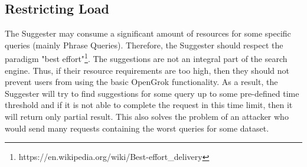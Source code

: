 \subsection{Restricting Load}
\label{restricting_load}
The Suggester may consume a significant amount of resources for some specific queries (mainly Phrase Queries).
Therefore, the Suggester should
respect the paradigm "best effort"\footnote{https://en.wikipedia.org/wiki/Best-effort\_delivery}. The suggestions are not
an integral part of the search engine. Thus, if their resource requirements are too high, then they should not prevent
users from using the basic OpenGrok functionality. As a result, the Suggester will try to find suggestions for some
query up to some pre-defined time threshold and if it is not able to complete the request in this time limit, then
it will return only partial result. This also solves the problem of an attacker who would send many requests containing
the worst queries for some dataset.


